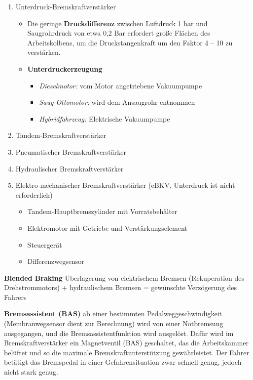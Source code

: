 \begin{enumerate}
\item
  Unterdruck-Bremskraftverstärker

  \begin{itemize}
  \item
    Die geringe \textbf{Druckdifferenz} zwischen Luftdruck 1 bar und
    Saugrohrdruck von etwa 0,2 Bar erfordert große Flächen des
    Arbeitskolbens, um die Druckstangenkraft um den Faktor 4 -- 10 zu
    verstärken.
  \item
    \textbf{Unterdruckerzeugung}

    \begin{itemize}
    \item
      \emph{Dieselmotor:} vom Motor angetriebene Vakuumpumpe
    \item
      \emph{Saug-Ottomotor:} wird dem Ansaugrohr entnommen
    \item
      \emph{Hybridfahrzeug:} Elektrische Vakuumpumpe
    \end{itemize}
  \end{itemize}
\item
  Tandem-Bremskraftverstärker
\item
  Pneumatischer Bremskraftverstärker
\item
  Hydraulischer Bremskraftverstärker
\item
  Elektro-mechanischer Bremskraftverstärker (eBKV, Unterdruck ist nicht
  erforderlich)

  \begin{itemize}
  \item
    Tandem-Hauptbremszylinder mit Vorratsbehälter
  \item
    Elektromotor mit Getriebe und Verstärkungselement
  \item
    Steuergerät
  \item
    Differenzwegsensor
  \end{itemize}
\end{enumerate}

\textbf{Blended Braking} Überlagerung von elektrischem Bremsen
(Rekuperation des Drehstrommotors) + hydraulischem Bremsen = gewünschte
Verzögerung des Fahrers

\textbf{Bremsassistent (BAS)} ab einer bestimmten
Pedalweggeschwindigkeit (Membranwegsensor dient zur Berechnung) wird von
einer Notbremsung ausgegangen, und die Bremsassistentfunktion wird
ausgelöst. Dafür wird im Bremskraftverstärker ein Magnetventil (BAS)
geschaltet, das die Arbeitskammer belüftet und so die maximale
Bremskraftunterstützung gewährleistet. Der Fahrer betätigt das
Bremspedal in einer Gefahrensituation zwar schnell genug, jedoch nicht
stark genug.

